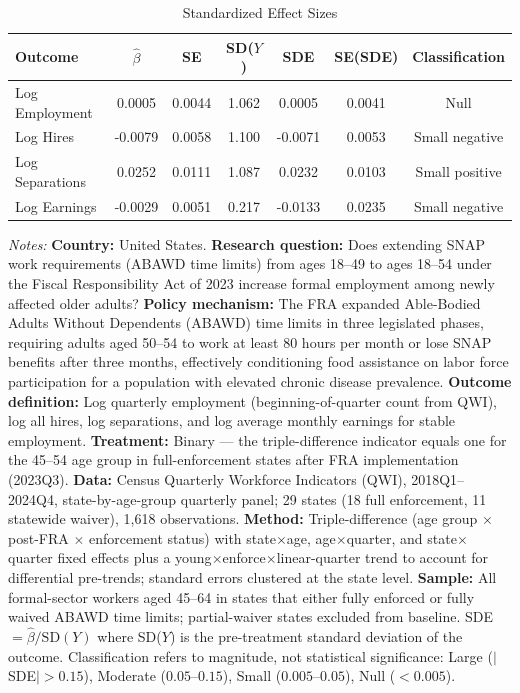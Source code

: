 \begin{table}[htbp]
\begin{threeparttable}
\centering
\caption{Standardized Effect Sizes}
\label{tab:sde}
\begin{tabular}{lcccccc}
\toprule
Outcome & $\hat{\beta}$ & SE & SD($Y$) & SDE & SE(SDE) & Classification \\
\midrule
Log Employment & 0.0005 & 0.0044 & 1.062 & 0.0005 & 0.0041 & Null \\
Log Hires & -0.0079 & 0.0058 & 1.100 & -0.0071 & 0.0053 & Small negative \\
Log Separations & 0.0252 & 0.0111 & 1.087 & 0.0232 & 0.0103 & Small positive \\
Log Earnings & -0.0029 & 0.0051 & 0.217 & -0.0133 & 0.0235 & Small negative \\
\bottomrule
\end{tabular}
\begin{tablenotes}[flushleft]
\small
\item \textit{Notes:} \textbf{Country:} United States. \textbf{Research question:} Does extending SNAP work requirements (ABAWD time limits) from ages 18--49 to ages 18--54 under the Fiscal Responsibility Act of 2023 increase formal employment among newly affected older adults? \textbf{Policy mechanism:} The FRA expanded Able-Bodied Adults Without Dependents (ABAWD) time limits in three legislated phases, requiring adults aged 50--54 to work at least 80 hours per month or lose SNAP benefits after three months, effectively conditioning food assistance on labor force participation for a population with elevated chronic disease prevalence. \textbf{Outcome definition:} Log quarterly employment (beginning-of-quarter count from QWI), log all hires, log separations, and log average monthly earnings for stable employment. \textbf{Treatment:} Binary --- the triple-difference indicator equals one for the 45--54 age group in full-enforcement states after FRA implementation (2023Q3). \textbf{Data:} Census Quarterly Workforce Indicators (QWI), 2018Q1--2024Q4, state-by-age-group quarterly panel; 29 states (18 full enforcement, 11 statewide waiver), 1,618 observations. \textbf{Method:} Triple-difference (age group $\times$ post-FRA $\times$ enforcement status) with state$\times$age, age$\times$quarter, and state$\times$quarter fixed effects plus a young$\times$enforce$\times$linear-quarter trend to account for differential pre-trends; standard errors clustered at the state level. \textbf{Sample:} All formal-sector workers aged 45--64 in states that either fully enforced or fully waived ABAWD time limits; partial-waiver states excluded from baseline. SDE $= \hat{\beta} / \text{SD}(Y)$ where SD($Y$) is the pre-treatment standard deviation of the outcome. Classification refers to magnitude, not statistical significance: Large ($|$SDE$| > 0.15$), Moderate ($0.05$--$0.15$), Small ($0.005$--$0.05$), Null ($< 0.005$).
\end{tablenotes}
\end{threeparttable}
\end{table}

